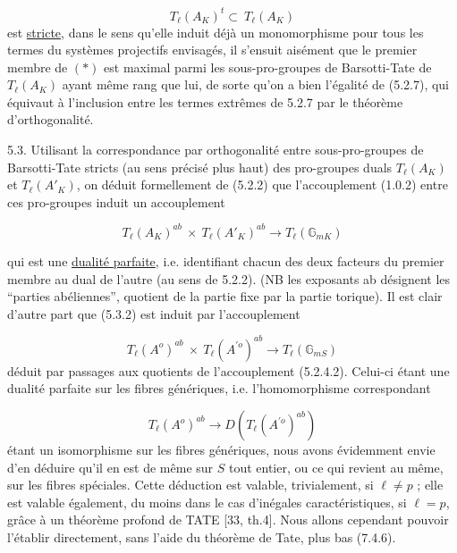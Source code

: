 \begin{equation}\tag{*}
T_\ell(A_K)^t \subset \ T_\ell(A_K)
\end{equation}
est \underline{stricte}, dans le sens qu'elle induit déjà un monomorphisme pour tous les termes du systèmes projectifs envisagés, il s'ensuit aisément que le premier membre de $(*)$ est maximal parmi les sous-pro-groupes de Barsotti-Tate de $T_\ell(A_K)$ ayant même rang que lui, de sorte qu'on a bien l'égalité de (5.2.7), qui équivaut à l'inclusion entre les termes extrêmes de 5.2.7 par le théorème d'orthogonalité.

5.3. Utilisant la correspondance par orthogonalité entre sous-pro-groupes de Barsotti-Tate stricts (au sens précisé plus haut) des pro-groupes duals $T_\ell(A_K)$ et $T_\ell(A'_K)$, on déduit formellement de (5.2.2) que l'accouplement (1.0.2) entre ces pro-groupes induit un accouplement

\begin{equation}\tag{5.3.2}
T_\ell(A_K)^{ab} \ \times \ T_\ell(A'_K)^{ab} \longrightarrow T_\ell(\mathbb{G}_{mK})
\end{equation}


qui est une \underline{dualité parfaite}, i.e. identifiant chacun des deux facteurs du premier membre au dual de l'autre (au sens de 5.2.2). (NB les exposants ab désignent les ``parties abéliennes'', quotient de la partie fixe par la partie torique). Il est clair d'autre part que (5.3.2) est induit par l'accouplement

\begin{equation}\tag{5.3.3}
T_\ell(A^o)^{ab} \ \times \ T_\ell(A^{\prime o})^{ab} \longrightarrow T_\ell(\mathbb{G}_{mS})
\end{equation}
déduit par passages aux quotients de l'accouplement (5.2.4.2). Celui-ci étant une dualité parfaite sur les fibres génériques, i.e. l'homomorphisme correspondant

\begin{equation}\tag{5.3.4}
T_\ell(A^o)^{ab} \longrightarrow D(T_\ell(A^{\prime o})^{ab})
\end{equation}
étant un isomorphisme sur les fibres génériques, nous avons évidemment envie d'en déduire qu'il en est de même sur $S$ tout entier, ou ce qui revient au même, sur les fibres spéciales. Cette déduction est valable, trivialement, si $\ell \neq p$ ; elle est valable également, du moins dans le cas d'inégales caractéristiques, si $\ell = p$, grâce à un théorème profond de TATE [33, th.4]. Nous allons cependant pouvoir l'établir directement, sans l'aide du théorème de Tate, plus bas (7.4.6).

